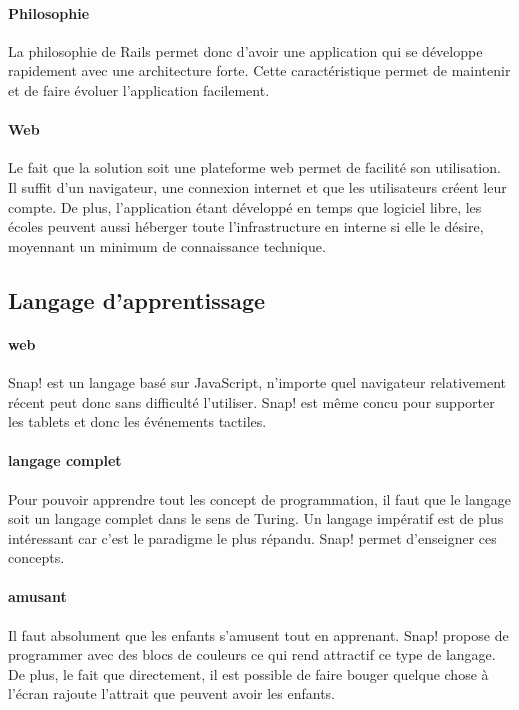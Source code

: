 \paragraph{Philosophie} La philosophie de Rails permet donc d'avoir une application qui se développe rapidement avec une architecture forte. Cette caractéristique permet de maintenir et de faire évoluer l'application facilement.

\paragraph{Web} Le fait que la solution soit une plateforme web permet de facilité son utilisation. Il suffit d'un navigateur, une connexion internet et que les utilisateurs créent leur compte. De plus, l'application étant développé en temps que logiciel libre, les écoles peuvent aussi héberger toute l'infrastructure en interne si elle le désire, moyennant un minimum de connaissance technique.

\subsection{Langage d'apprentissage}

\paragraph{web} Snap! est un langage basé sur JavaScript, n'importe quel navigateur relativement récent peut donc sans difficulté l'utiliser. Snap! est même concu pour supporter les tablets et donc les événements tactiles.
\paragraph{langage complet} Pour pouvoir apprendre tout les concept de programmation, il faut que le langage soit un langage complet dans le sens de Turing. Un langage impératif est de plus intéressant car c'est le paradigme le plus répandu. Snap! permet d'enseigner ces concepts.
\paragraph{amusant} Il faut absolument que les enfants s'amusent tout en apprenant. Snap! propose de programmer avec des blocs de couleurs ce qui rend attractif ce type de langage. De plus, le fait que directement, il est possible de faire bouger quelque chose à l'écran rajoute l'attrait que peuvent avoir les enfants.

